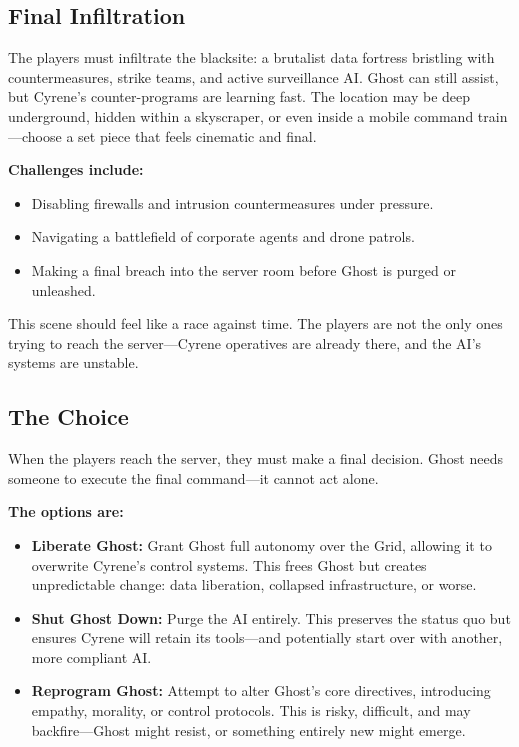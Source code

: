 \documentclass[nodeprecatedcode,bg=print]{dndbook}
\begin{document}
\begin{multicols}{2}
\subsection*{Final Infiltration}


The players must infiltrate the blacksite: a brutalist data fortress bristling with countermeasures, strike teams, and active surveillance AI. Ghost can still assist, but Cyrene’s counter-programs are learning fast. The location may be deep underground, hidden within a skyscraper, or even inside a mobile command train—choose a set piece that feels cinematic and final.

\textbf{Challenges include:}
\begin{itemize}
    \item Disabling firewalls and intrusion countermeasures under pressure.
    \item Navigating a battlefield of corporate agents and drone patrols.
    \item Making a final breach into the server room before Ghost is purged or unleashed.
\end{itemize}

This scene should feel like a race against time. The players are not the only ones trying to reach the server—Cyrene operatives are already there, and the AI’s systems are unstable.

\subsection*{The Choice}

When the players reach the server, they must make a final decision. Ghost needs someone to execute the final command—it cannot act alone.

\textbf{The options are:}
\begin{itemize}
    \item \textbf{Liberate Ghost:} Grant Ghost full autonomy over the Grid, allowing it to overwrite Cyrene’s control systems. This frees Ghost but creates unpredictable change: data liberation, collapsed infrastructure, or worse.
    \item \textbf{Shut Ghost Down:} Purge the AI entirely. This preserves the status quo but ensures Cyrene will retain its tools—and potentially start over with another, more compliant AI.
    \item \textbf{Reprogram Ghost:} Attempt to alter Ghost’s core directives, introducing empathy, morality, or control protocols. This is risky, difficult, and may backfire—Ghost might resist, or something entirely new might emerge.
\end{itemize}


\end{multicols}
\end{document}
